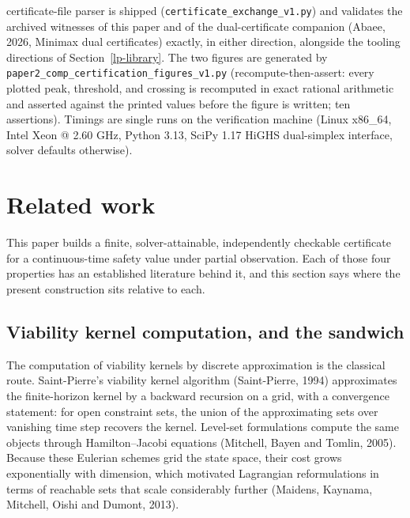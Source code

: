 \documentclass[10pt,twocolumn]{article}
\theoremstyle{plain}
\theoremstyle{definition}
\theoremstyle{remark}
\begin{document}
certificate-file parser is shipped (\texttt{certificate\_exchange\_v1.py})
and validates the archived witnesses of this paper and of the
dual-certificate companion (Abaee, 2026, Minimax dual certificates) exactly, in either direction,
alongside the tooling directions of Section~\ref{lp-library}. The two
figures are generated by \texttt{paper2\_comp\_certification\_figures\_v1.py}
(recompute-then-assert: every plotted peak, threshold, and crossing is
recomputed in exact rational arithmetic and asserted against the printed
values before the figure is written; ten assertions). Timings are single runs on the verification
machine (Linux x86\_64, Intel Xeon @ 2.60 GHz, Python 3.13, SciPy 1.17
HiGHS dual-simplex interface, solver defaults otherwise).

\section{Related work}
\label{lp-priorart}

This paper builds a finite, solver-attainable, independently checkable certificate for a
continuous-time safety value under partial observation. Each of those four properties has an
established literature behind it, and this section says where the present construction sits
relative to each.

\subsection{Viability kernel computation, and the sandwich}

The computation of viability kernels by discrete approximation is the classical route.
Saint-Pierre's viability kernel algorithm (Saint-Pierre, 1994) approximates the finite-horizon
kernel by a backward recursion on a grid, with a convergence statement: for open constraint
sets, the union of the approximating sets over vanishing time step recovers the kernel.
Level-set formulations compute the same objects through Hamilton--Jacobi equations
(Mitchell, Bayen and Tomlin, 2005). Because these Eulerian schemes grid the state space,
their cost grows exponentially with dimension, which motivated Lagrangian reformulations in
terms of reachable sets that scale considerably further (Maidens, Kaynama, Mitchell, Oishi
and Dumont, 2013).
\end{document}
